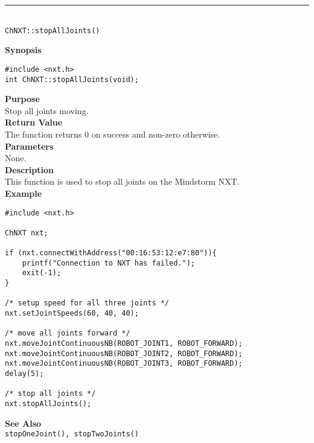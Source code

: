 \noindent
\vspace{5pt}
\rule{4.5in}{0.015in}\\
\noindent
{\LARGE \texttt{ChNXT::stopAllJoints()} }\\


\noindent
{\bf Synopsis}
\vspace{-8pt}
\begin{verbatim}
#include <nxt.h>
int ChNXT::stopAllJoints(void);
\end{verbatim}

\noindent
{\bf Purpose}\\
Stop all joints moving.\\

\noindent
{\bf Return Value}\\
The function returns 0 on success and non-zero otherwise.\\

\noindent
{\bf Parameters}\\
None.\\

\noindent
{\bf Description}\\
This function is used to stop all joints on the Mindstorm NXT.\\

\noindent
{\bf Example}
\begin{verbatim}
#include <nxt.h> 

ChNXT nxt;

if (nxt.connectWithAddress("00:16:53:12:e7:80")){
    printf("Connection to NXT has failed.");
    exit(-1);
}
    
/* setup speed for all three joints */
nxt.setJointSpeeds(60, 40, 40);

/* move all joints forward */
nxt.moveJointContinuousNB(ROBOT_JOINT1, ROBOT_FORWARD);
nxt.moveJointContinuousNB(ROBOT_JOINT2, ROBOT_FORWARD);
nxt.moveJointContinuousNB(ROBOT_JOINT3, ROBOT_FORWARD);
delay(5);

/* stop all joints */
nxt.stopAllJoints();
\end{verbatim}

\noindent
{\bf See Also}\\
\texttt{stopOneJoint(), stopTwoJoints()}\\
